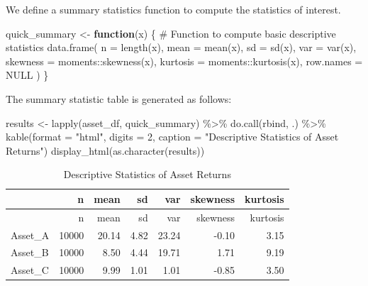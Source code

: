\documentclass[
  12pt,
  letterpaper,
]{scrbook}
\newenvironment{Shaded}{\begin{snugshade}}{\end{snugshade}}
\newcommand{\AttributeTok}[1]{\textcolor[rgb]{0.40,0.45,0.13}{#1}}
\newcommand{\CommentTok}[1]{\textcolor[rgb]{0.37,0.37,0.37}{#1}}
\newcommand{\ConstantTok}[1]{\textcolor[rgb]{0.56,0.35,0.01}{#1}}
\newcommand{\ControlFlowTok}[1]{\textcolor[rgb]{0.00,0.23,0.31}{\textbf{#1}}}
\newcommand{\DecValTok}[1]{\textcolor[rgb]{0.68,0.00,0.00}{#1}}
\newcommand{\FunctionTok}[1]{\textcolor[rgb]{0.28,0.35,0.67}{#1}}
\newcommand{\NormalTok}[1]{\textcolor[rgb]{0.00,0.23,0.31}{#1}}
\newcommand{\OtherTok}[1]{\textcolor[rgb]{0.00,0.23,0.31}{#1}}
\newcommand{\SpecialCharTok}[1]{\textcolor[rgb]{0.37,0.37,0.37}{#1}}
\newcommand{\StringTok}[1]{\textcolor[rgb]{0.13,0.47,0.30}{#1}}
\theoremstyle{plain}
\theoremstyle{definition}
\theoremstyle{remark}
\begin{document}
We define a summary statistics function to compute the statistics of
interest.

\begin{Shaded}
\begin{Highlighting}[]
\NormalTok{quick\_summary }\OtherTok{\textless{}{-}} \ControlFlowTok{function}\NormalTok{(x) \{}
  \CommentTok{\# Function to compute basic descriptive statistics}
  \FunctionTok{data.frame}\NormalTok{(}
    \AttributeTok{n =} \FunctionTok{length}\NormalTok{(x),}
    \AttributeTok{mean =} \FunctionTok{mean}\NormalTok{(x),}
    \AttributeTok{sd =} \FunctionTok{sd}\NormalTok{(x),}
    \AttributeTok{var =} \FunctionTok{var}\NormalTok{(x),}
    \AttributeTok{skewness =}\NormalTok{ moments}\SpecialCharTok{::}\FunctionTok{skewness}\NormalTok{(x),}
    \AttributeTok{kurtosis =}\NormalTok{ moments}\SpecialCharTok{::}\FunctionTok{kurtosis}\NormalTok{(x),}
    \AttributeTok{row.names =} \ConstantTok{NULL}
\NormalTok{  )}
\NormalTok{\}}
\end{Highlighting}
\end{Shaded}

The summary statistic table is generated as follows:

\begin{Shaded}
\begin{Highlighting}[]
\NormalTok{results }\OtherTok{\textless{}{-}} \FunctionTok{lapply}\NormalTok{(asset\_df, quick\_summary) }\SpecialCharTok{\%\textgreater{}\%}
    \FunctionTok{do.call}\NormalTok{(rbind, .) }\SpecialCharTok{\%\textgreater{}\%}
    \FunctionTok{kable}\NormalTok{(}\AttributeTok{format =} \StringTok{"html"}\NormalTok{, }\AttributeTok{digits =} \DecValTok{2}\NormalTok{, }\AttributeTok{caption =} \StringTok{"Descriptive Statistics of Asset Returns"}\NormalTok{)}
\FunctionTok{display\_html}\NormalTok{(}\FunctionTok{as.character}\NormalTok{(results)) }
\end{Highlighting}
\end{Shaded}

\begin{longtable}[]{@{}lrrrrrr@{}}
\caption{Descriptive Statistics of Asset Returns}\tabularnewline
\toprule\noalign{}
& n & mean & sd & var & skewness & kurtosis \\
\midrule\noalign{}
\endfirsthead
\toprule\noalign{}
& n & mean & sd & var & skewness & kurtosis \\
\midrule\noalign{}
\endhead
\bottomrule\noalign{}
\endlastfoot
Asset\_A & 10000 & 20.14 & 4.82 & 23.24 & -0.10 & 3.15 \\
Asset\_B & 10000 & 8.50 & 4.44 & 19.71 & 1.71 & 9.19 \\
Asset\_C & 10000 & 9.99 & 1.01 & 1.01 & -0.85 & 3.50 \\
\end{longtable}
\end{document}
